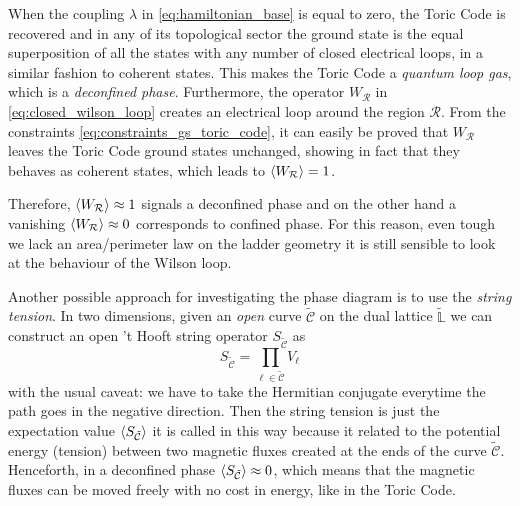 When the coupling $\lambda$ in \eqref{eq:hamiltonian_base} is equal to zero, the Toric Code is recovered and in any of its topological sector the ground state is the equal superposition of all the states with any number of closed electrical loops, in a similar fashion to coherent states.
This makes the Toric Code a \emph{quantum loop gas}, which is a \emph{deconfined phase}.
Furthermore, the operator $W_{\mathcal{R}}$ in \eqref{eq:closed_wilson_loop} creates an electrical loop around the region $\mathcal{R}$.
From the constraints \eqref{eq:constraints_gs_toric_code}, it can easily be proved that $W_{\mathcal{R}}$ leaves the Toric Code ground states unchanged, showing in fact that they behaves as coherent states, which leads to $\ev{W_{\mathcal{R}}} = 1$.

Therefore, $\ev{W_{\mathcal{R}}} \approx 1$ signals a deconfined phase and on the other hand a vanishing $\ev{W_{\mathcal{R}}} \approx 0$ corresponds to confined phase.
For this reason, even tough we lack an area/perimeter law on the ladder geometry it is still sensible to look at the behaviour of the Wilson loop.


Another possible approach for investigating the phase diagram is to use the \emph{string tension}.
In two dimensions, given an \emph{open} curve $\tilde{\mathcal{C}}$ on the dual lattice $\tilde{\mathbb{L}}$ we can construct an open 't Hooft string operator $S_{\tilde{\mathcal{C}}}$ as
\begin{equation}
    S_{\tilde{\mathcal{C}}} = \prod_{\ell \in \tilde{\mathcal{C}}} V_{\ell}
\end{equation}
with the usual caveat: we have to take the Hermitian conjugate everytime the path goes in the negative direction.
Then the string tension is just the expectation value $\ev{S_{\tilde{\mathcal{C}}}}$ it is called in this way because it related to the potential energy (tension) between two magnetic fluxes created at the ends of the curve $\tilde{\mathcal{C}}$.
Henceforth, in a deconfined phase $\ev{S_{\tilde{\mathcal{C}}}} \approx 0$, which means that the magnetic fluxes can be moved freely with no cost in energy, like in the Toric Code.


